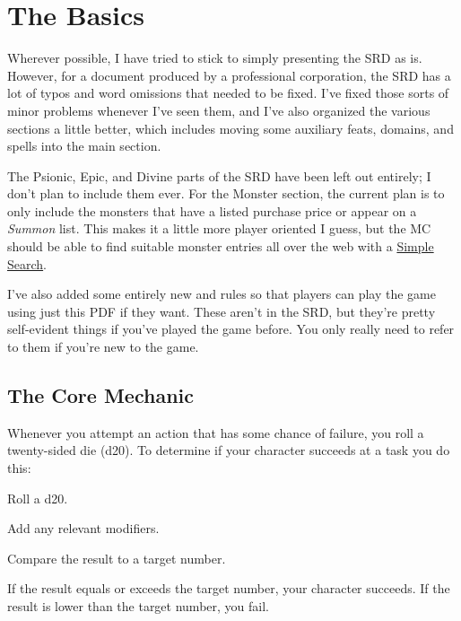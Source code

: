 \chapter{The Basics}\label{chapter:Basics}

Wherever possible, I have tried to stick to simply presenting the SRD as is. However, for a document produced by a professional corporation, the SRD has a lot of typos and word omissions that needed to be fixed. I've fixed those sorts of minor problems whenever I've seen them, and I've also organized the various sections a little better, which includes moving some auxiliary feats, domains, and spells into the main section.

The Psionic, Epic, and Divine parts of the SRD have been left out entirely; I don't plan to include them ever. For the Monster section, the current plan is to only include the monsters that have a listed purchase price or appear on a \textit{Summon} list. This makes it a little more player oriented I guess, but the MC should be able to find suitable monster entries all over the web with a \href{https://www.google.com/search?q=SRD monsters}{Simple Search}.

I've also added some entirely new  and  rules so that players can play the game using just this PDF if they want. These aren't in the SRD, but they're pretty self-evident things if you've played the game before. You only really need to refer to them if you're new to the game.

\section{The Core Mechanic}
Whenever you attempt an action that has some chance 
of failure, you roll a twenty-sided die (d20). To determine if your character succeeds 
at a task you do this:
\begin{itemize*}
\item Roll a d20.
\item Add any relevant modifiers.
\item Compare the result to a target number.
\end{itemize*}
If the result equals or exceeds the target number, your character succeeds. If 
the result is lower than the target number, you fail.

